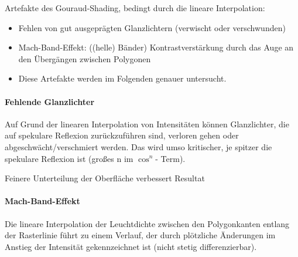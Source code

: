 \documentclass[10pt,landscape]{article}
\begin{document}
\begin{multicols}{3}
{  %
  
  Artefakte des Gouraud-Shading, bedingt durch die lineare Interpolation:
  \begin{itemize}
    \item Fehlen von gut ausgeprägten Glanzlichtern (verwischt oder verschwunden)
    \item Mach-Band-Effekt: ((helle) Bänder) Kontrastverstärkung durch das Auge an den Übergängen zwischen Polygonen
    \item Diese Artefakte werden im Folgenden genauer untersucht.
  \end{itemize}
  
  \paragraph{Fehlende Glanzlichter}
  Auf Grund der linearen Interpolation von Intensitäten können Glanzlichter, die auf spekulare Reflexion zurückzuführen sind, verloren gehen oder abgeschwächt/verschmiert werden. Das wird umso kritischer, je spitzer die spekulare Reflexion ist (großes n im $\cos^n$- Term).
  
  Feinere Unterteilung der Oberfläche verbessert Resultat
  
  
  \paragraph{Mach-Band-Effekt}
  Die lineare Interpolation der Leuchtdichte zwischen den Polygonkanten entlang der Rasterlinie führt zu einem Verlauf, der durch plötzliche Änderungen im Anstieg der Intensität gekennzeichnet ist (nicht stetig differenzierbar).
  
}
\end{multicols}
\end{document}
